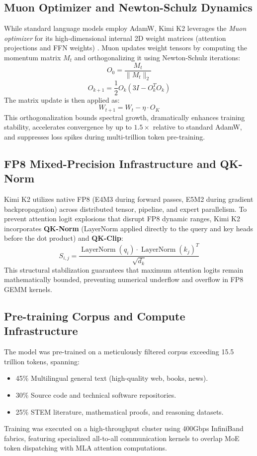 \documentclass[conference]{IEEEtran}
\begin{document}
\subsection{Muon Optimizer and Newton-Schulz Dynamics}
While standard language models employ AdamW, Kimi K2 leverages the \textit{Muon optimizer} for its high-dimensional internal 2D weight matrices (attention projections and FFN weights) \cite{jordan2024muon}. Muon updates weight tensors by computing the momentum matrix $M_t$ and orthogonalizing it using Newton-Schulz iterations:
\begin{equation}
O_0 = \frac{M_t}{\|M_t\|_2}
\end{equation}
\begin{equation}
O_{k+1} = \frac{1}{2} O_k (3 I - O_k^T O_k)
\end{equation}
The matrix update is then applied as:
\begin{equation}
W_{t+1} = W_t - \eta \cdot O_K
\end{equation}
This orthogonalization bounds spectral growth, dramatically enhances training stability, accelerates convergence by up to $1.5\times$ relative to standard AdamW, and suppresses loss spikes during multi-trillion token pre-training.

\subsection{FP8 Mixed-Precision Infrastructure and QK-Norm}
Kimi K2 utilizes native FP8 (E4M3 during forward passes, E5M2 during gradient backpropagation) across distributed tensor, pipeline, and expert parallelism. To prevent attention logit explosions that disrupt FP8 dynamic ranges, Kimi K2 incorporates \textbf{QK-Norm} (LayerNorm applied directly to the query and key heads before the dot product) and \textbf{QK-Clip}:
\begin{equation}
S_{i,j} = \frac{\operatorname{LayerNorm}(q_i) \cdot \operatorname{LayerNorm}(k_j)^T}{\sqrt{d_k}}
\end{equation}
This structural stabilization guarantees that maximum attention logits remain mathematically bounded, preventing numerical underflow and overflow in FP8 GEMM kernels.

\subsection{Pre-training Corpus and Compute Infrastructure}
The model was pre-trained on a meticulously filtered corpus exceeding 15.5 trillion tokens, spanning:
\begin{itemize}
    \item 45\% Multilingual general text (high-quality web, books, news).
    \item 30\% Source code and technical software repositories.
    \item 25\% STEM literature, mathematical proofs, and reasoning datasets.
\end{itemize}
Training was executed on a high-throughput cluster using 400Gbps InfiniBand fabrics, featuring specialized all-to-all communication kernels to overlap MoE token dispatching with MLA attention computations.
\end{document}
